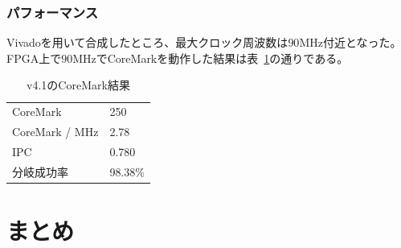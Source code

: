\documentclass[dvipdfmx,10pt,a4paper,titlepage]{jsarticle}
\begin{document}
    \subsubsection{パフォーマンス}
    Vivadoを用いて合成したところ、最大クロック周波数は$90\mathrm{MHz}$付近となった。
    FPGA上で$90\mathrm{MHz}$でCoreMarkを動作した結果は表~\ref{tab:v4.1}の通りである。
    \begin{table}[h]
        \begin{center}
            \caption{v4.1のCoreMark結果}\label{tab:v4.1}
            \begin{tabular}{ll}
                CoreMark & 250\\
                CoreMark / MHz & 2.78 \\
                IPC & 0.780 \\
                分岐成功率 & 98.38\% \\
            \end{tabular}
        \end{center}
    \end{table}

    \section{まとめ}
\end{document}

